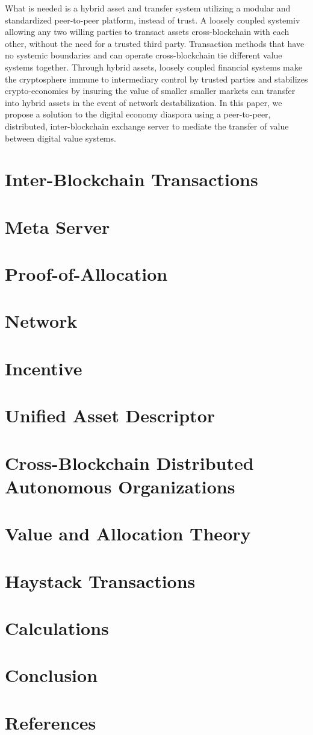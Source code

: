\documentclass[a4paper]{article}
\begin{document}
What is needed is a hybrid asset and transfer system utilizing a modular and standardized peer-to-peer platform, instead of trust. A loosely coupled systemiv allowing any two willing parties to transact assets cross-blockchain with each other, without the need for a trusted third party. Transaction methods that have no systemic boundaries and can operate cross-blockchain tie different value systems together. Through hybrid assets, loosely coupled financial systems make the cryptosphere immune to intermediary control by trusted parties and stabilizes crypto-economies by insuring the value of smaller smaller markets can transfer into hybrid assets in the event of network destabilization. In this paper, we propose a solution to the digital economy diaspora using a peer-to-peer, distributed, inter-blockchain exchange server to mediate the transfer of value between digital value systems.

\section{Inter-Blockchain Transactions}
\section{Meta Server}
\section{Proof-of-Allocation}
\section{Network}
\section{Incentive}
\section{Unified Asset Descriptor}
\section{Cross-Blockchain Distributed Autonomous Organizations}
\section{Value and Allocation Theory}
\section{Haystack Transactions}
\section{Calculations}
\section{Conclusion}



\section{References}

{}

\end{document}
